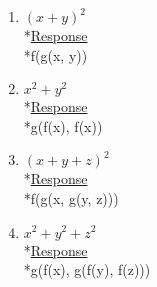 \documentclass[12pt]{article}
\begin{document}
\begin{enumerate}
\item $(x+y)^2$
\smallskip
\\*\uline{Response}
\\*f(g(x, y))
\item $x^2 + y^2$
\smallskip
\\*\uline{Response}
\\*g(f(x), f(x))
\item $(x+y+z)^2$
\smallskip
\\*\uline{Response}
\\*f(g(x, g(y, z)))
\item $x^2+y^2+z^2$
\smallskip
\\*\uline{Response}
\\*g(f(x), g(f(y), f(z)))
\end{enumerate}
\end{document}
